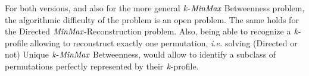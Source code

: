 \documentclass{article}
\newcommand{\M}{\mbox{\it MinMax}}
\newcommand{\kM}{\mbox{\it k}}
\begin{document}
For both versions, and also for the more general $\kM$-$\M$ {\sc Betweenness} problem, the 
algorithmic difficulty of the problem is an open problem. The same holds for the
{\sc Directed $\M$-Reconstruction} problem. Also, being able to recognize
a $\kM$-profile allowing to reconstruct exactly one permutation, {\em i.e.} solving
(Directed or not) {\sc Unique} $\kM$-$\M$ {\sc Betweenness}, would allow to
identify a subclass of permutations perfectly represented by their $\kM$-profile.




\end{document}
